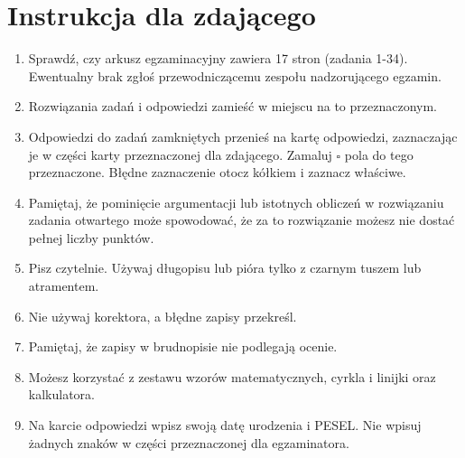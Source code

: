 \documentclass[10pt]{article}
\begin{document}
\section*{Instrukcja dla zdającego}
\begin{enumerate}
  \item Sprawdź, czy arkusz egzaminacyjny zawiera 17 stron (zadania 1-34). Ewentualny brak zgłoś przewodniczącemu zespołu nadzorującego egzamin.
  \item Rozwiązania zadań i odpowiedzi zamieść w miejscu na to przeznaczonym.
  \item Odpowiedzi do zadań zamkniętych przenieś na kartę odpowiedzi, zaznaczając je w części karty przeznaczonej dla zdającego. Zamaluj \(\square\) pola do tego przeznaczone. Błędne zaznaczenie otocz kółkiem i zaznacz właściwe.
  \item Pamiętaj, że pominięcie argumentacji lub istotnych obliczeń w rozwiązaniu zadania otwartego może spowodować, że za to rozwiązanie możesz nie dostać pełnej liczby punktów.
  \item Pisz czytelnie. Używaj długopisu lub pióra tylko z czarnym tuszem lub atramentem.
  \item Nie używaj korektora, a błędne zapisy przekreśl.
  \item Pamiętaj, że zapisy w brudnopisie nie podlegają ocenie.
  \item Możesz korzystać z zestawu wzorów matematycznych, cyrkla i linijki oraz kalkulatora.
  \item Na karcie odpowiedzi wpisz swoją datę urodzenia i PESEL. Nie wpisuj żadnych znaków w części przeznaczonej dla egzaminatora.\\

\end{enumerate}
\end{document}

